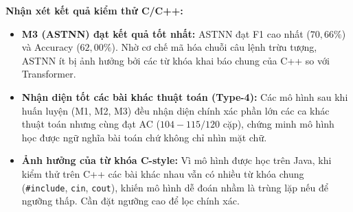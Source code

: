 \documentclass[11pt,a4paper]{article}
\begin{document}
\begin{table}[H]
\centering
\caption{Số lượng mẫu nhận diện đúng trên từng nhóm C/C++}
\label{tab:coder_breakdown}
\end{table}

\textbf{Nhận xét kết quả kiểm thử C/C++:}
\begin{itemize}
\item \textbf{M3 (ASTNN) đạt kết quả tốt nhất:} ASTNN đạt F1 cao nhất ($70,66\%$) và Accuracy ($62,00\%$). Nhờ cơ chế mã hóa chuỗi câu lệnh trừu tượng, ASTNN ít bị ảnh hưởng bởi các từ khóa khai báo chung của C++ so với Transformer.
\item \textbf{Nhận diện tốt các bài khác thuật toán (Type-4):} Các mô hình sau khi huấn luyện (M1, M2, M3) đều nhận diện chính xác phần lớn các ca khác thuật toán nhưng cùng đạt AC ($104 - 115 / 120$ cặp), chứng minh mô hình học được ngữ nghĩa bài toán chứ không chỉ nhìn mặt chữ.
\item \textbf{Ảnh hưởng của từ khóa C-style:} Vì mô hình được học trên Java, khi kiểm thử trên C++ các bài khác nhau vẫn có nhiều từ khóa chung (\texttt{\#include}, \texttt{cin}, \texttt{cout}), khiến mô hình dễ đoán nhầm là trùng lặp nếu để ngưỡng thấp. Cần đặt ngưỡng cao để lọc chính xác.
\end{itemize}
\end{document}
